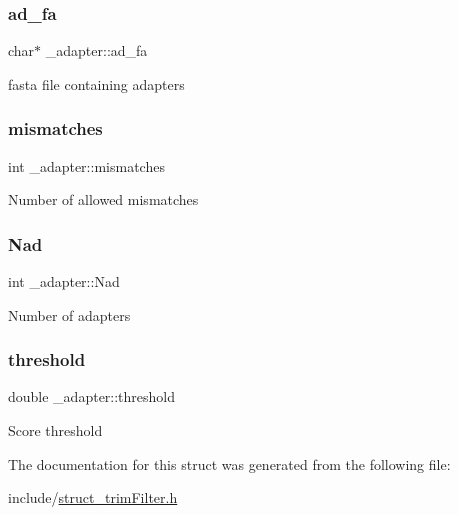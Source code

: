 \subsubsection{\texorpdfstring{ad\+\_\+fa}{ad\_fa}}
{\footnotesize\ttfamily char$\ast$ \+\_\+adapter\+::ad\+\_\+fa}

fasta file containing adapters \mbox{\label{struct__adapter_a51c6998b13837c66f79b3a1dd3c11995}} 
\subsubsection{\texorpdfstring{mismatches}{mismatches}}
{\footnotesize\ttfamily int \+\_\+adapter\+::mismatches}

Number of allowed mismatches \mbox{\label{struct__adapter_aed006c3b66849e781049076b11f297d3}} 
\subsubsection{\texorpdfstring{Nad}{Nad}}
{\footnotesize\ttfamily int \+\_\+adapter\+::\+Nad}

Number of adapters \mbox{\label{struct__adapter_a2d1273cfaa0d51c79f331b92ed2342b4}} 
\subsubsection{\texorpdfstring{threshold}{threshold}}
{\footnotesize\ttfamily double \+\_\+adapter\+::threshold}

Score threshold 

The documentation for this struct was generated from the following file\+:\begin{DoxyCompactItemize}
\item 
include/\mbox{\hyperlink{struct__trimFilter_8h}{struct\+\_\+trim\+Filter.\+h}}\end{DoxyCompactItemize}

